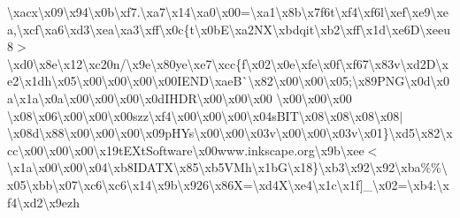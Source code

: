\textbackslash{}xacx\textbackslash{}x09\textbackslash{}x94\textbackslash{}x0b\textbackslash{}xf7.\textbackslash{}xa7\textbackslash{}x14\textbackslash{}xa0\textbackslash{}x00=\textbackslash{}xa1\textbackslash{}x8b\textbackslash{}x7f6t\textbackslash{}xf4\textbackslash{}xf6l\textbackslash{}xef\textbackslash{}xe9\textbackslash{}xea,\textbackslash{}xcf\textbackslash{}xa6\textbackslash{}xd3\textbackslash{}xea\textbackslash{}xa3\textbackslash{}xff\textbackslash{}x0c\{t\textbackslash{}x0b\+E\textbackslash{}xa2\+N\+X\textbackslash{}xbdqit\textbackslash{}xb2\textbackslash{}xff\textbackslash{}x1d\textbackslash{}xe6\+D\textbackslash{}xeeu8$>$\textbackslash{}xd0\textbackslash{}x8e\textbackslash{}x12\textbackslash{}xc20n/\textbackslash{}x9e\textbackslash{}x80ye\textbackslash{}xe7\textbackslash{}xcc\{f\textbackslash{}x02\textbackslash{}x0e\textbackslash{}xfe\textbackslash{}x0f\textbackslash{}xf67\textbackslash{}x83v\textbackslash{}xd2\+D\textbackslash{}xe2\textbackslash{}x1dh\textbackslash{}x05\textbackslash{}x00\textbackslash{}x00\textbackslash{}x00\textbackslash{}x00\+I\+E\+N\+D\textbackslash{}xae\+B\`{}\textbackslash{}x82\textbackslash{}x00\textbackslash{}x00\textbackslash{}x05;\textbackslash{}x89\+P\+N\+G\textbackslash{}x0d\textbackslash{}x0a\textbackslash{}x1a\textbackslash{}x0a\textbackslash{}x00\textbackslash{}x00\textbackslash{}x00\textbackslash{}x0d\+I\+H\+D\+R\textbackslash{}x00\textbackslash{}x00\textbackslash{}x00 \textbackslash{}x00\textbackslash{}x00\textbackslash{}x00 \textbackslash{}x08\textbackslash{}x06\textbackslash{}x00\textbackslash{}x00\textbackslash{}x00szz\textbackslash{}xf4\textbackslash{}x00\textbackslash{}x00\textbackslash{}x00\textbackslash{}x04s\+B\+I\+T\textbackslash{}x08\textbackslash{}x08\textbackslash{}x08\textbackslash{}x08$\vert$\textbackslash{}x08d\textbackslash{}x88\textbackslash{}x00\textbackslash{}x00\textbackslash{}x00\textbackslash{}x09p\+H\+Ys\textbackslash{}x00\textbackslash{}x00\textbackslash{}x03v\textbackslash{}x00\textbackslash{}x00\textbackslash{}x03v\textbackslash{}x01\}\textbackslash{}xd5\textbackslash{}x82\textbackslash{}xcc\textbackslash{}x00\textbackslash{}x00\textbackslash{}x00\textbackslash{}x19t\+E\+Xt\+Software\textbackslash{}x00www.\+inkscape.\+org\textbackslash{}x9b\textbackslash{}xee$<$\textbackslash{}x1a\textbackslash{}x00\textbackslash{}x00\textbackslash{}x04\textbackslash{}xb8\+I\+D\+A\+T\+X\textbackslash{}x85\textbackslash{}xb5\+V\+Mh\textbackslash{}x1b\+G\textbackslash{}x18\}\textbackslash{}xb3\textbackslash{}x92\textbackslash{}x92\textbackslash{}xba\%\%\textbackslash{}x05\textbackslash{}xbb\textbackslash{}x07\textquotesingle{}\textbackslash{}xc6\textbackslash{}xc6\textbackslash{}x14\textbackslash{}x9b\textbackslash{}x926\textbackslash{}x86\+X=\textbackslash{}xd4\+X\textbackslash{}xe4\textbackslash{}x1c\textbackslash{}x1f\mbox{]}\+\_\+\textbackslash{}x02=\textbackslash{}xb4\+:\textbackslash{}xf4\textbackslash{}xd2\textbackslash{}x9ezh 